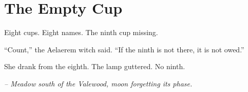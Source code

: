 \chapter*{The Empty Cup}

Eight cups. Eight names. The ninth cup missing.

“Count,” the Aelaerem witch said. “If the ninth is not there, it is not owed.”

She drank from the eighth. The lamp guttered. No ninth.

\smallskip

\noindent \textit{– Meadow south of the Valewood, moon forgetting its phase.}

